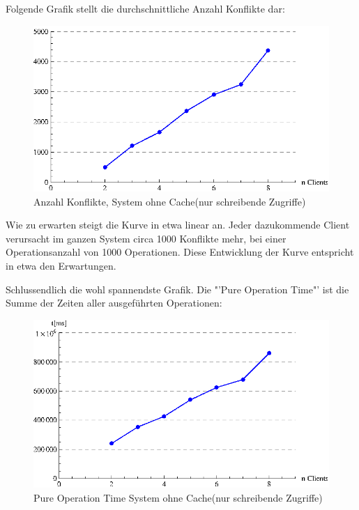 Folgende Grafik stellt die durchschnittliche Anzahl Konflikte dar:

\begin{figure}[H]
\begin{center}
\includegraphics[width=\textwidth]{images_MessErgebnisse/incrementRMIKonfliktzahl.eps}
\end{center}
\caption{Anzahl Konflikte, System ohne Cache(nur schreibende Zugriffe)}
\end{figure}

Wie zu erwarten steigt die Kurve in etwa linear an. Jeder dazukommende Client verursacht im ganzen System circa 1000 Konflikte mehr, bei einer Operationsanzahl von 1000 Operationen. Diese Entwicklung der Kurve entspricht in etwa den Erwartungen. 

Schlussendlich die wohl spannendste Grafik. Die "'Pure Operation Time"' ist die Summe der Zeiten aller ausgeführten Operationen:

\begin{figure}[H]
\begin{center}
\includegraphics[width=\textwidth]{images_MessErgebnisse/incrementRMIPureOperationTime.eps}
\end{center}
\caption{Pure Operation Time System ohne Cache(nur schreibende Zugriffe)}
\end{figure}

